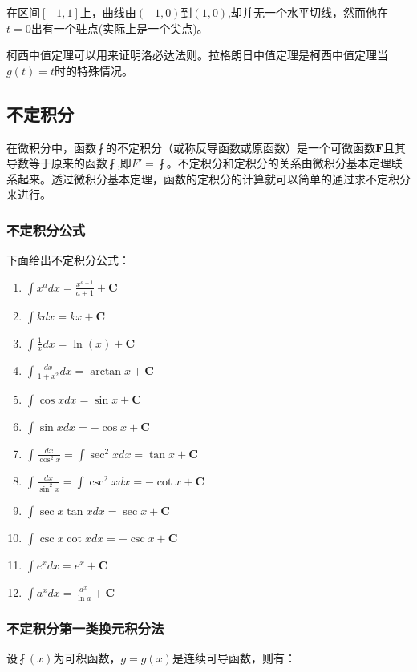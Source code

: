 \documentclass[UTF8]{ctexbook}
\newcommand{\defFunction}[1]{\fint(#1)}
\newcommand{\mathConstant}{\mathbf{C}}
\begin{document}
{{{{  在区间$[-1,1]$上，曲线由$(-1, 0)$到$(1,0)$,却并无一个水平切线，然而他在$t = 0$出有一个驻点(实际上是一个尖点)。

  柯西中值定理可以用来证明洛必达法则。拉格朗日中值定理是柯西中值定理当$g(t) = t$时的特殊情况。
}%

}%

\subsection{不定积分}{
  在微积分中，函数$\fint$的不定积分（或称反导函数或原函数）是一个可微函数$\mathbf{F}$且其导数等于原来的函数$\fint$,即$F\prime = \fint$。不定积分和定积分的关系由微积分基本定理联系起来。透过微积分基本定理，函数的定积分的计算就可以简单的通过求不定积分来进行。

  \subsubsection{不定积分公式}{
    下面给出不定积分公式：

    \begin{enumerate}
      \item $\int x^adx = \frac{x^{a+1}}{a+1} + \mathConstant$
      \item $\int kdx = kx + \mathConstant$
      \item $\int \frac{1}{x}dx = \ln(x) + \mathConstant$
      \item $\int \frac{dx}{1+x^2}dx = \arctan x + \mathConstant$
      \item $\int \cos xdx = \sin x + \mathConstant$
      \item $\int \sin xdx = -\cos x + \mathConstant$
      \item $\int \frac{dx}{\cos^2x} = \int \sec^2xdx = \tan x + \mathConstant$
      \item $\int \frac{dx}{\sin^2x} = \int\csc^2xdx = -\cot x + \mathConstant$
      \item $\int \sec x\tan xdx = \sec x + \mathConstant$
      \item $\int \csc x\cot xdx = -\csc x + \mathConstant$
      \item $\int e^xdx = e^x + \mathConstant$
      \item $\int a^xdx = \frac{a^x}{\ln a} + \mathConstant$
    \end{enumerate}

  }%

  \subsubsection{不定积分第一类换元积分法}{
    设$\defFunction{x}$为可积函数，$g = g(x)$是连续可导函数，则有：

}}}}
\end{document}
